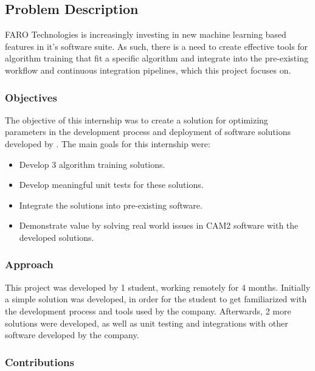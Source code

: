 
\subsection{Problem Description}

FARO Technologies\textsuperscript{\textregistered} is increasingly investing in new machine learning based features in it's software suite. As such, there is a need to create effective tools for algorithm training that fit a specific algorithm and integrate into the pre-existing workflow and continuous integration pipelines, which this project focuses on.

\subsubsection{Objectives}

The objective of this internship was to create a solution for optimizing parameters in the development process and deployment of software solutions developed by \faro. The main goals for this internship were:

\begin{itemize}
	\item Develop 3 algorithm training solutions.
	\item Develop meaningful unit tests for these solutions.
	\item Integrate the solutions into pre-existing software.
	\item Demonstrate value by solving real world issues in CAM2\textsuperscript{\textregistered} software with the developed solutions.
\end{itemize}

\subsubsection{Approach}

This project was developed by 1 student, working remotely for 4 months. Initially a simple solution was developed, in order for the student to get familiarized with the development process and tools used by the company. Afterwards, 2 more solutions were developed, as well as unit testing and integrations with other software developed by the company.

\subsubsection{Contributions}

